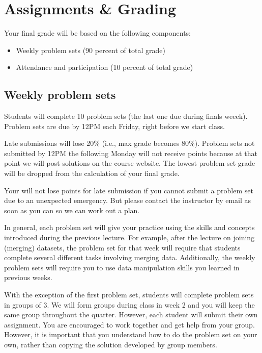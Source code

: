\documentclass[11pt,]{article}
\providecommand{\tightlist}{%
  \setlength{\itemsep}{0pt}\setlength{\parskip}{0pt}}
\begin{document}
\hypertarget{assignments-grading}{%
\section{Assignments \& Grading}\label{assignments-grading}}

Your final grade will be based on the following components:

\begin{itemize}
\tightlist
\item
  Weekly problem sets (90 percent of total grade)
\item
  Attendance and participation (10 percent of total grade)
\end{itemize}

\hypertarget{weekly-problem-sets}{%
\subsection{Weekly problem sets}\label{weekly-problem-sets}}

Students will complete 10 problem sets (the last one due during finals
weeek). Problem sets are due by 12PM each Friday, right before we start
class.

Late submissions will lose 20\% (i.e., max grade becomes 80\%). Problem
sets not submitted by 12PM the following Monday will not receive points
because at that point we will post solutions on the course website. The
lowest problem-set grade will be dropped from the calculation of your
final grade.

Your will not lose points for late submission if you cannot submit a
problem set due to an unexpected emergency. But please contact the
instructor by email as soon as you can so we can work out a plan.

In general, each problem set will give your practice using the skills
and concepts introduced during the previous lecture. For example, after
the lecture on joining (merging) datasets, the problem set for that week
will require that students complete several different tasks involving
merging data. Additionally, the weekly problem sets will require you to
use data manipulation skills you learned in previous weeks.

With the exception of the first problem set, students will complete
problem sets in groups of 3. We will form groups during class in week 2
and you will keep the same group throughout the quarter. However, each
student will submit their own assignment. You are encouraged to work
together and get help from your group. However, it is important that you
understand how to do the problem set on your own, rather than copying
the solution developed by group members.
\end{document}
